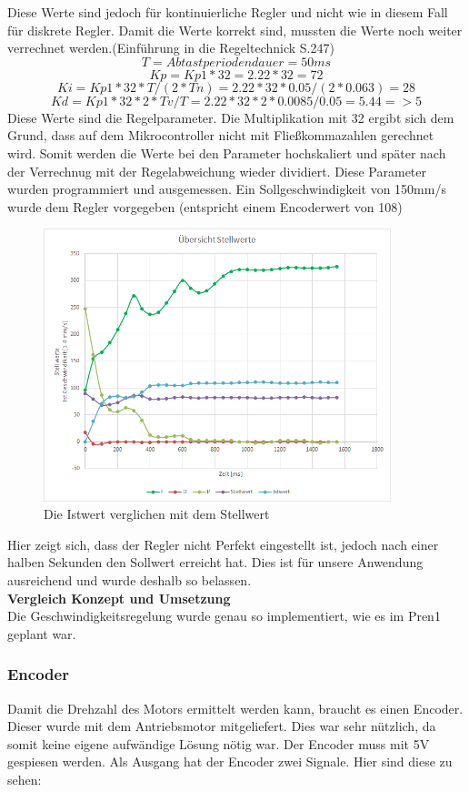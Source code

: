 Diese Werte sind jedoch für kontinuierliche Regler und nicht wie in diesem Fall für diskrete Regler. Damit die Werte korrekt sind, mussten die Werte noch weiter verrechnet werden.(Einführung in die Regeltechnick S.247)
\[ T=Abtastperiodendauer=50ms\]
\[ Kp=Kp1*32=2.22*32=72\]
\[ Ki=Kp1*32*T/(2*Tn)=2.22*32*0.05/(2*0.063)=28\]
\[ Kd=Kp1*32*2*Tv/T=2.22*32*2*0.0085/0.05=5.44 =>5\]
Diese Werte sind die Regelparameter. Die Multiplikation mit 32 ergibt sich dem Grund, dass auf dem Mikrocontroller nicht mit Fließkommazahlen gerechnet wird. Somit werden die Werte bei den Parameter hochskaliert und später nach der Verrechnug mit der Regelabweichung wieder dividiert.
Diese Parameter wurden programmiert und ausgemessen. Ein Sollgeschwindigkeit von 150mm/s wurde dem Regler vorgegeben (entspricht einem Encoderwert von 108)
\begin{figure}[H]%
\centering
\includegraphics[width=0.9\textwidth]{03_Loesungskonzept/pictures/StellwertePID.png}
\caption{Die Istwert verglichen mit dem Stellwert}
\label{fig:IstSollwertVergleich}
\end{figure}
Hier zeigt sich, dass der Regler nicht Perfekt eingestellt ist, jedoch nach einer halben Sekunden den Sollwert erreicht hat. Dies ist für unsere Anwendung ausreichend und wurde deshalb so belassen.\\[0.2cm]
\textbf{Vergleich Konzept und Umsetzung}\\[0.2cm]
Die Geschwindigkeitsregelung wurde genau so implementiert, wie es im Pren1 geplant war.
\subsubsection{Encoder}
Damit die Drehzahl des Motors ermittelt werden kann, braucht es einen Encoder. Dieser wurde mit dem Antriebsmotor mitgeliefert. Dies war sehr nützlich, da somit keine eigene aufwändige Lösung nötig war. Der Encoder muss mit 5V gespiesen werden. Als Ausgang hat der Encoder zwei Signale. Hier sind diese zu sehen:

